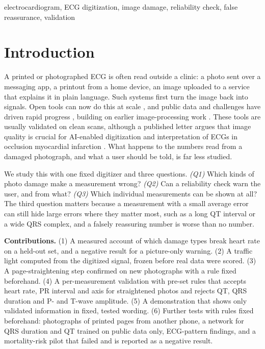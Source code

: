 \documentclass[conference]{IEEEtran}
\begin{document}
\begin{IEEEkeywords}
electrocardiogram, ECG digitization, image damage, reliability check, false reassurance, validation
\end{IEEEkeywords}

\section{Introduction}

A printed or photographed ECG is often read outside a clinic: a photo sent over a messaging app, a printout from a home device, an image uploaded to a service that explains it in plain language. Such systems first turn the image back into signals. Open tools can now do this at scale \cite{ref5,ref3,ref53}, and public data and challenges have driven rapid progress \cite{ref1,ref2,ref4}, building on earlier image-processing work \cite{ref6,ref9}. These tools are usually validated on clean scans, although a published letter argues that image quality is crucial for AI-enabled digitization and interpretation of ECGs in occlusion myocardial infarction \cite{ref61}. What happens to the numbers read from a damaged photograph, and what a user should be told, is far less studied.

We study this with one fixed digitizer and three questions. \emph{(Q1)} Which kinds of photo damage make a measurement wrong? \emph{(Q2)} Can a reliability check warn the user, and from what? \emph{(Q3)} Which individual measurements can be shown at all? The third question matters because a measurement with a small average error can still hide large errors where they matter most, such as a long QT interval or a wide QRS complex, and a falsely reassuring number is worse than no number.

\textbf{Contributions.} (1) A measured account of which damage types break heart rate on a held-out set, and a negative result for a picture-only warning. (2) A traffic light computed from the digitized signal, frozen before real data were scored. (3) A page-straightening step confirmed on new photographs with a rule fixed beforehand. (4) A per-measurement validation with pre-set rules that accepts heart rate, PR interval and axis for straightened photos and rejects QT, QRS duration and P- and T-wave amplitude. (5) A demonstration that shows only validated information in fixed, tested wording. (6) Further tests with rules fixed beforehand: photographs of printed pages from another phone, a network for QRS duration and QT trained on public data only, ECG-pattern findings, and a mortality-risk pilot that failed and is reported as a negative result.
\end{document}
